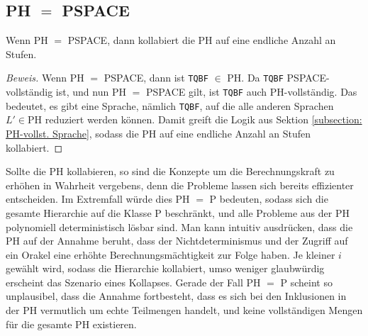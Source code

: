 \subsection{PH $=$ PSPACE}
\begin{theorem}
    Wenn PH $=$ PSPACE, dann kollabiert die PH auf eine endliche Anzahl an Stufen.
\end{theorem}

\begin{proof}[Beweis]\cite[S.98]{arora_computational_2009}
    Wenn PH $=$ PSPACE, dann ist \texttt{TQBF} $\in$ PH. Da \texttt{TQBF} PSPACE-vollständig ist, und nun PH $=$ PSPACE gilt, ist \texttt{TQBF} auch PH-vollständig.
    Das bedeutet, es gibt eine Sprache, nämlich \texttt{TQBF}, auf die alle anderen Sprachen $L' \in \text{PH}$ reduziert werden können.
    Damit greift die Logik aus Sektion \ref{subsection: PH-vollst. Sprache}, sodass die PH auf eine endliche Anzahl an Stufen kollabiert.
\end{proof}

Sollte die PH kollabieren, so sind die Konzepte um die Berechnungskraft zu erhöhen in Wahrheit vergebens, denn die Probleme lassen sich bereits effizienter entscheiden.
Im Extremfall würde dies PH $=$ P bedeuten, sodass sich die gesamte Hierarchie auf die Klasse P beschränkt, und alle Probleme aus der PH polynomiell deterministisch lösbar sind.
Man kann intuitiv ausdrücken, dass die PH auf der Annahme beruht, dass der Nichtdeterminismus und der Zugriff auf ein Orakel eine erhöhte Berechnungsmächtigkeit zur Folge haben.
Je kleiner $i$ gewählt wird, sodass die Hierarchie kollabiert, umso weniger glaubwürdig erscheint das Szenario eines Kollapses.
Gerade der Fall PH $=$ P scheint so unplausibel, dass die Annahme fortbesteht, dass es sich bei den Inklusionen in der PH vermutlich um echte Teilmengen handelt, und keine vollständigen Mengen für die gesamte PH existieren.
